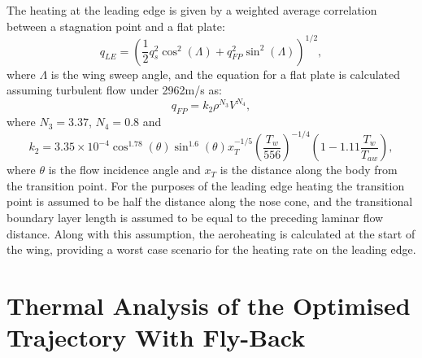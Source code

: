 The heating at the leading edge is given by a weighted average correlation between a stagnation point and a flat plate\cite{Dirkx,Tauber2008}:
\begin{equation}
q_{LE} = (\frac{1}{2}q_s^2 \cos^2(\Lambda) + q_{FP}^2 \sin^2(\Lambda))^{1/2},
\end{equation}
where $\Lambda$ is the wing sweep angle, and the equation for a flat plate is calculated assuming turbulent flow under 2962m/s as:
\begin{equation}
q_{FP} = k_2\rho^{N_3}V^{N_4},
\end{equation}
where $N_3 = 3.37$, $N_4 = 0.8$ and
\begin{equation}
k_2 = 3.35 \times 10^{-4} \cos^{1.78}(\theta) \sin^{1.6}(\theta) x_T^{-1/5} (\frac{T_w}{556})^{-1/4} (1 - 1.11\frac{T_w}{T_{aw}}),
\end{equation}
where $\theta$ is the flow incidence angle and $x_T$ is the distance along the body from the transition point\cite{Dirkx,Tauber2008}. For the purposes of the leading edge heating the transition point is assumed to be half the distance along the nose cone, and the transitional boundary layer length is assumed to be equal to the preceding laminar flow distance. Along with this assumption, the aeroheating is calculated at the start of the wing, providing a worst case scenario for the heating rate on the leading edge. 





\section{Thermal Analysis of the Optimised Trajectory With Fly-Back}
 

